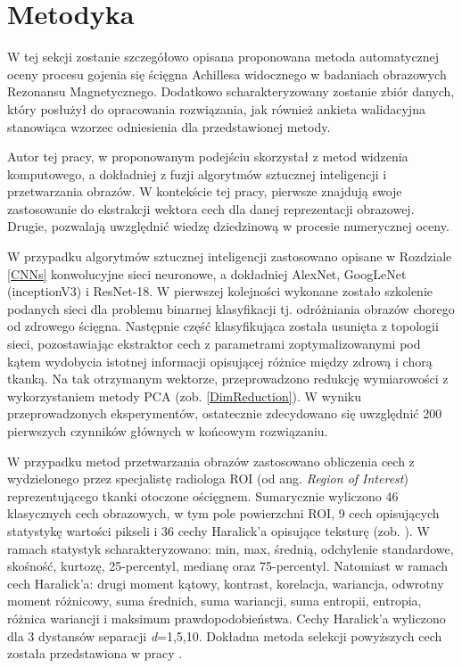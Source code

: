 \section{Metodyka}

W tej sekcji zostanie szczegółowo opisana proponowana metoda automatycznej oceny procesu gojenia się ścięgna Achillesa widocznego w badaniach obrazowych Rezonansu Magnetycznego. Dodatkowo scharakteryzowany zostanie zbiór danych, który posłużył do opracowania rozwiązania, jak również ankieta walidacyjna stanowiąca wzorzec odniesienia dla przedstawionej metody. 

Autor tej pracy, w proponowanym podejściu skorzystał z metod widzenia komputowego, a dokładniej z fuzji algorytmów sztucznej inteligencji i przetwarzania obrazów. W kontekście tej pracy, pierwsze znajdują swoje zastosowanie do ekstrakcji wektora cech dla danej reprezentacji obrazowej. Drugie, pozwalają uwzględnić wiedzę dziedzinową w procesie numerycznej oceny.

W przypadku algorytmów sztucznej inteligencji zastosowano  opisane w Rozdziale \ref{CNNs} konwolucyjne sieci neuronowe, a dokładniej AlexNet, GoogLeNet (inceptionV3) i ResNet-18. W pierwszej kolejności wykonane zostało szkolenie podanych sieci dla problemu binarnej klasyfikacji tj. odróżniania obrazów chorego od zdrowego ścięgna. Następnie część klasyfikująca została usunięta z topologii sieci, pozostawiając ekstraktor cech z parametrami zoptymalizowanymi pod kątem wydobycia istotnej informacji opisującej różnice między zdrową i chorą tkanką. Na tak otrzymanym wektorze, przeprowadzono redukcję wymiarowości z wykorzystaniem metody PCA (zob. \ref{DimReduction}). W wyniku przeprowadzonych eksperymentów, ostatecznie zdecydowano się uwzględnić 200 pierwszych czynników głównych w końcowym rozwiązaniu.

W przypadku metod przetwarzania obrazów zastosowano obliczenia cech z wydzielonego przez specjalistę radiologa ROI (od ang. \textit{Region of Interest}) reprezentującego tkanki otoczone ościęgnem. Sumarycznie wyliczono 46 klasycznych cech obrazowych, w tym pole powierzchni ROI, 9 cech opisujących statystykę wartości pikseli i 36 cechy Haralick'a opisujące teksturę (zob. \cite{Haralick1973}). W ramach statystyk scharakteryzowano: min, max, średnią, odchylenie standardowe, skośność, kurtozę, 25-percentyl, medianę oraz 75-percentyl. Natomiast w ramach cech Haralick'a: drugi moment kątowy, kontrast, korelacja, wariancja, odwrotny moment różnicowy, suma średnich, suma wariancji, suma entropii, entropia, różnica wariancji i maksimum prawdopodobieństwa. Cechy Haralick'a wyliczono dla 3 dystansów separacji \textit{d}=1,5,10. Dokładna metoda selekcji powyższych cech została przedstawiona w pracy  \cite{Nowosielski17}.  

